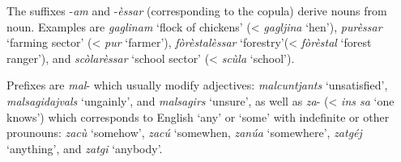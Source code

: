 The suffixes -\textit{am} and -\textit{èssar} (corresponding to the copula) derive nouns from noun. Examples are \textit{gaglinam} `flock of chickens' (< \textit{gagljina} `hen'), \textit{purèssar} `farming sector' (< \textit{pur} `farmer'), \textit{fòrèstalèssar} `forestry'(< \textit{fòrèstal} `forest ranger'), and \textit{scòlarèssar} `school sector' (< \textit{scùla} `school'). 

Prefixes are \textit{mal}- which usually modify adjectives: \textit{malcuntjants} `unsatisfied', \textit{malsagidajvals} `ungainly', and \textit{malsagirs} `unsure', as well as \textit{za}- (< \textit{ins sa} `one knows') which corresponds to English `any' or `some' with indefinite or other prounouns: \textit{zacù} `somehow', \textit{zacú} `somewhen, \textit{zanúa} `somewhere', \textit{zatgéj} `anything', and \textit{zatgi} `anybody'.



